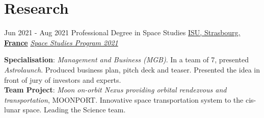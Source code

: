 \documentclass[letterpaper]{twentysecondcv} %
\begin{document}
\newpage
\makeextrainfo %

\section{Research}
\begin{twenty}
	\twentyitem
    	{Jun 2021 -}
		{Aug 2021}
        {Professional Degree in Space Studies}
        {\href{https://www.isunet.edu/}{ISU, Strasbourg, \textbf{France}}}
        {\href{https://www.isunet.edu/ssp/}{\textit{Space Studies Program 2021}}}
        {
            \textbf{Specialisation}: \textit{Management and Business (MGB)}. In a team of 7, presented \textit{Astrolaunch}. Produced business plan, pitch deck and teaser. Presented the idea in front of jury of investors and experts.\\
            \textbf{Team Project}: \textit{Moon on-orbit Nexus providing orbital rendezvous and transportation}, MOONPORT. Innovative space transportation system to the cis-lunar space. Leading the Science team.

}
\end{twenty}
\end{document}
